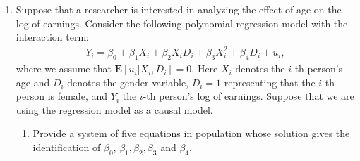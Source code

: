 \documentclass[11pt]{article}
\newcommand{\Blue}{\color{blue}}
\begin{document}
\begin{enumerate}




 \item Suppose that a researcher is interested in analyzing the effect of age on the log of earnings. Consider the following polynomial regression model with the interaction term:
 \begin{eqnarray*}
 	Y_i = \beta_0 + \beta_1 X_i + \beta_2 X_i D_i + \beta_3 X_i^2 + \beta_4 D_i + u_i,
 \end{eqnarray*}
 where we assume that $\mathbf{E}[u_i|X_i,D_i] = 0$. Here $X_i$ denotes the $i$-th person's age and $D_i$ denotes the gender variable, $D_i=1$ representing that the $i$-th person is female, and $Y_i$ the $i$-th person's log of earnings. Suppose that we are using the regression model as a causal model.


\begin{enumerate}
\item Provide a system of five equations in population whose solution gives the identification of $\beta_0$, $\beta_1,\beta_2,\beta_3$ and $\beta_4$.
\bigskip


\end{enumerate}
\end{enumerate}
\end{document}

